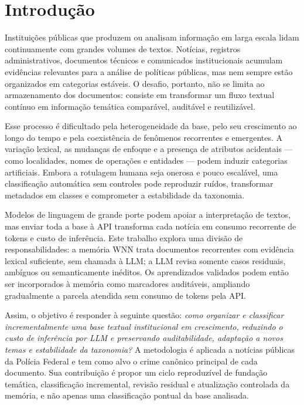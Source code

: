 \section{Introdução}

Instituições públicas que produzem ou analisam informação em larga escala lidam continuamente com grandes volumes de textos. Notícias, registros administrativos, documentos técnicos e comunicados institucionais acumulam evidências relevantes para a análise de políticas públicas, mas nem sempre estão organizados em categorias estáveis. O desafio, portanto, não se limita ao armazenamento dos documentos: consiste em transformar um fluxo textual contínuo em informação temática comparável, auditável e reutilizável.

Esse processo é dificultado pela heterogeneidade da base, pelo seu crescimento ao longo do tempo e pela coexistência de fenômenos recorrentes e emergentes. A variação lexical, as mudanças de enfoque e a presença de atributos acidentais --- como localidades, nomes de operações e entidades --- podem induzir categorias artificiais. Embora a rotulagem humana seja onerosa e pouco escalável, uma classificação automática sem controles pode reproduzir ruídos, transformar metadados em classes e comprometer a estabilidade da taxonomia.

Modelos de linguagem de grande porte podem apoiar a interpretação de textos, mas enviar toda a base à API transforma cada notícia em consumo recorrente de tokens e custo de inferência. Este trabalho explora uma divisão de responsabilidades: a memória WNN trata documentos recorrentes com evidência lexical suficiente, sem chamada à LLM; a LLM revisa somente casos residuais, ambíguos ou semanticamente inéditos. Os aprendizados validados podem então ser incorporados à memória como marcadores auditáveis, ampliando gradualmente a parcela atendida sem consumo de tokens pela API.

Assim, o objetivo é responder à seguinte questão: \textit{como organizar e classificar incrementalmente uma base textual institucional em crescimento, reduzindo o custo de inferência por LLM e preservando auditabilidade, adaptação a novos temas e estabilidade da taxonomia?} A metodologia é aplicada a notícias públicas da Polícia Federal e tem como alvo o crime canônico principal de cada documento. Sua contribuição é propor um ciclo reproduzível de fundação temática, classificação incremental, revisão residual e atualização controlada da memória, e não apenas uma classificação pontual da base analisada.

